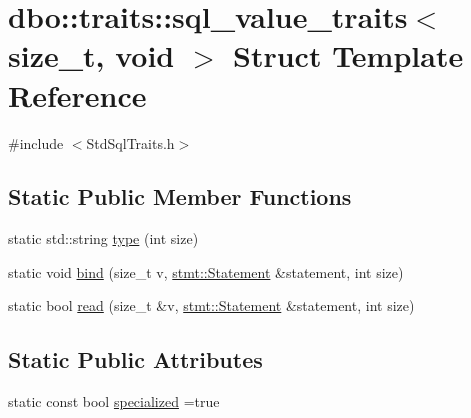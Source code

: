 \hypertarget{structdbo_1_1traits_1_1sql__value__traits_3_01size__t_00_01void_01_4}{\section{dbo\+:\+:traits\+:\+:sql\+\_\+value\+\_\+traits$<$ size\+\_\+t, void $>$ Struct Template Reference}
\label{structdbo_1_1traits_1_1sql__value__traits_3_01size__t_00_01void_01_4}
}


{\ttfamily \#include $<$Std\+Sql\+Traits.\+h$>$}

\subsection*{Static Public Member Functions}
\begin{DoxyCompactItemize}
\item 
static std\+::string \hyperlink{structdbo_1_1traits_1_1sql__value__traits_3_01size__t_00_01void_01_4_ad75722a868b313ca32d695c34b366b4b}{type} (int size)
\item 
static void \hyperlink{structdbo_1_1traits_1_1sql__value__traits_3_01size__t_00_01void_01_4_a3e4ff80ea517b697c9404fe253c63466}{bind} (size\+\_\+t v, \hyperlink{classdbo_1_1stmt_1_1_statement}{stmt\+::\+Statement} \&statement, int size)
\item 
static bool \hyperlink{structdbo_1_1traits_1_1sql__value__traits_3_01size__t_00_01void_01_4_a1148f98b73c6733fa52dad05098f08ce}{read} (size\+\_\+t \&v, \hyperlink{classdbo_1_1stmt_1_1_statement}{stmt\+::\+Statement} \&statement, int size)
\end{DoxyCompactItemize}
\subsection*{Static Public Attributes}
\begin{DoxyCompactItemize}
\item 
static const bool \hyperlink{structdbo_1_1traits_1_1sql__value__traits_3_01size__t_00_01void_01_4_ae2e4a1d9acfdf62e18892b58a50b57d8}{specialized} =true
\end{DoxyCompactItemize}


